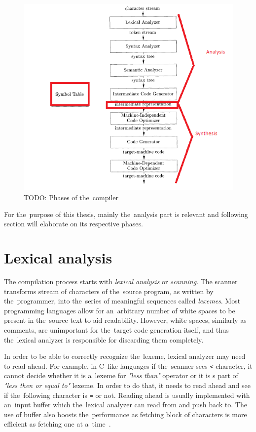 \documentclass[
  digital, %
  table,   %
  lof,     %
  lot,     %
  oneside,
]{fithesis3}
\begin{document}
\begin{figure}[h!]
		\centering
			\includegraphics[scale=0.75]{img/compiler-phases}
		\caption{TODO: Phases of the~compiler~\cite{dragon-book}}
		\label{fig:compiler-phases}
\end{figure}

For the~purpose of this thesis, mainly the~analysis part is relevant and following section will elaborate on its respective phases.

  \section{Lexical analysis}
The compilation process starts with \textit{lexical analysis} or \textit{scanning}. The scanner transforms stream of characters of the~source program, as written by the~programmer, into the~series of meaningful sequences called \textit{lexemes}. Most programming languages allow for an~arbitrary number of white spaces to be present in the~source text to aid readability. However, white spaces, similarly as comments, are unimportant for the~target code generation itself, and thus the~lexical analyzer is responsible for discarding them completely.

In order to be able to correctly recognize the~lexeme, lexical analyzer may need to read ahead. For example, in C--like languages if the~scanner sees \texttt{<} character, it cannot decide whether it is a~lexeme for \textit{"less than"} operator or it is s part of \textit{"less then or equal to"} lexeme. In order to do that, it needs to read ahead and see if the~following character is \texttt{=} or not. Reading ahead is usually implemented with an~input buffer which the~lexical analyzer can read from and push back to. The use of buffer also boosts the~performance as fetching block of characters is more efficient as fetching one at a~time~\cite{dragon-book}.
\end{document}
